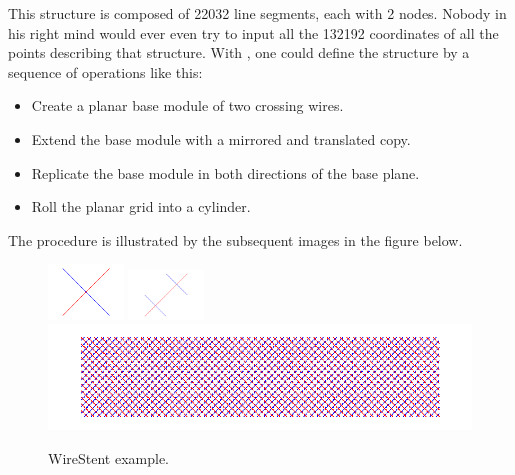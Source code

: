 This structure is composed of 22032 line segments, each with 2 nodes. Nobody in his right mind would ever even try to input all the 132192 coordinates of all the points describing that structure. 
With \pyformex, one could define the structure by a sequence of operations like this:
 \begin{itemize}
 \item Create a planar base module of two crossing wires.
 \item Extend the base module with a mirrored and translated copy.
 \item Replicate the base module in both directions of the base plane.
 \item Roll the planar grid into a cylinder.
 \end{itemize}
 The procedure is illustrated by the subsequent images in the figure below.
 \begin{figure}[h]
   \centering
   \begin{makeimage}
   \end{makeimage}
   \begin{latexonly}
     \includegraphics[width=2cm]{images/wirestent-1}
     \includegraphics[width=2cm]{images/wirestent-2}
     \includegraphics[width=12cm]{images/wirestent-3}
   \end{latexonly}
   \begin{htmlonly}
   \end{htmlonly}  
   \label{fig:WireStent steps}
   \caption{WireStent example.}
 \end{figure}


